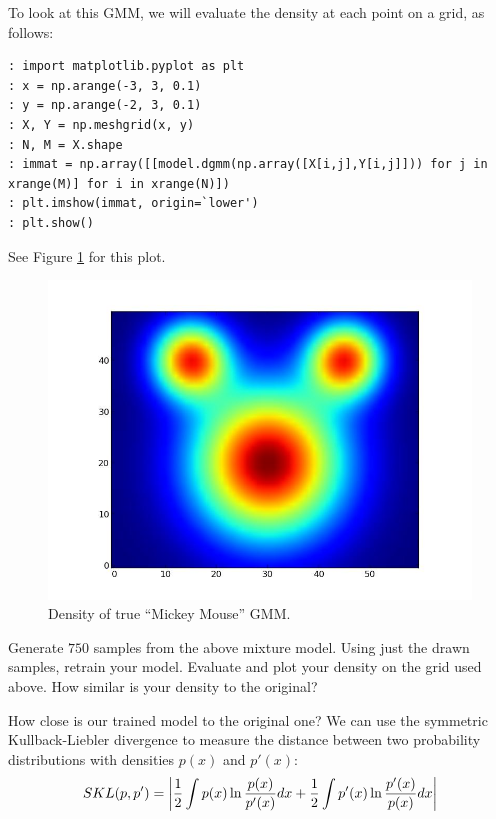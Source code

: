 To look at this GMM, we will evaluate the density at each point on a grid, as follows:
\begin{lstlisting}
: import matplotlib.pyplot as plt
: x = np.arange(-3, 3, 0.1)
: y = np.arange(-2, 3, 0.1)
: X, Y = np.meshgrid(x, y)
: N, M = X.shape
: immat = np.array([[model.dgmm(np.array([X[i,j],Y[i,j]])) for j in xrange(M)] for i in xrange(N)])
: plt.imshow(immat, origin=`lower')
: plt.show()
\end{lstlisting}

See Figure \ref{fig:mickeygmm} for this plot.
\begin{figure}[h]
\centering
\includegraphics[width=\textwidth]{truemickeygmm.jpeg}
\caption{Density of true ``Mickey Mouse'' GMM.}
\label{fig:mickeygmm}
\end{figure}

\begin{problem}
Generate $750$ samples from the above mixture model. Using just the drawn samples, retrain your model. Evaluate and plot your density on the grid used above. How similar is your density to the original?
\end{problem}

How close is our trained model to the original one? We can use the symmetric Kullback-Liebler divergence to measure the distance between two probability distributions with densities $p(x)$ and $p'(x)$:
\begin{equation*}
SKL(p,p') = \left\lvert\frac{1}{2} \int p(x) \ln \frac{p(x)}{p'(x)} dx + \frac{1}{2} \int p'(x) \ln \frac{p'(x)}{p(x)} dx\right\rvert
\end{equation*}

